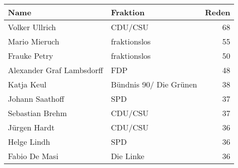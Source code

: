 
\begin{tabular}{llr}
\toprule
Name & Fraktion & Reden\\
\midrule
Volker Ullrich & CDU/CSU & 68\\
Mario Mieruch & fraktionslos & 55\\
Frauke Petry & fraktionslos & 50\\
Alexander Graf Lambsdorff & FDP & 48\\
Katja Keul & Bündnis 90/ Die Grünen & 38\\
Johann Saathoff & SPD & 37\\
Sebastian Brehm & CDU/CSU & 37\\
Jürgen Hardt & CDU/CSU & 36\\
Helge Lindh & SPD & 36\\
Fabio De Masi & Die Linke & 36\\
\bottomrule
\end{tabular}